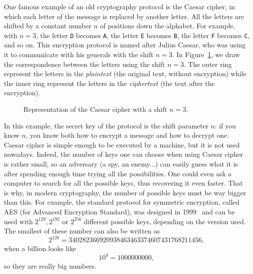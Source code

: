 One famous example of an old cryptography protocol is the Caesar cipher, in
which each letter of the message is replaced by another letter. All the letters
are shifted by a constant number $n$ of positions down the alphabet. For
example, with $n=3$, the letter \texttt{D} becomes \texttt{A}, the letter
\texttt{E} becomes \texttt{B}, the letter \texttt{F} becomes \texttt{C}, and so
on. This encryption protocol is named after Julius Caesar,
who was using it to communicate with his generals with the shift $n=3$. In
Figure~\ref{fig:caesar}, we draw the correspondence between the letters using
the shift $n=3$. The outer ring represent the letters in the \emph{plaintext}
(the original text, without encryption) while the inner ring represent the
letters in the \emph{ciphertext} (the text after the encryption).
\begin{figure}[h]
  \centering
  \caption{Representation of the Caesar cipher with a shift $n=3$.}
  \label{fig:caesar}
\end{figure}
In this example, the secret key of the protocol is the shift parameter $n$: if
you know $n$, you know both how to encrypt a message and how to decrypt one.
Caesar cipher is simple enough to be executed by a machine, but it is not used
nowadays. Indeed, the number of keys one can choose when using Caesar cipher is
rather small, so an adversary (a spy, an enemy...) can easily guess what it is
after spending enough time trying all the possibilities. One could even ask a
computer to search for all the possible keys, thus recovering it even faster.
That is why, in modern cryptography, the number of possible keys must be way
bigger than this. For example, the standard protocol for symmetric encryption,
called AES (for Advanced Encryption Standard), was designed in 1999~\cite{DR99,
DR02} and can be used with $2^{128}, 2^{192}$ or $2^{256}$ different possible
keys, depending on the version used. The smallest of these number can also be
written as
\[
  2^{128} = 340282366920938463463374607431768211456,
\]
when a billion looks like
\[
  10^{9} = 1000000000,
\]
so they are really big numbers.


